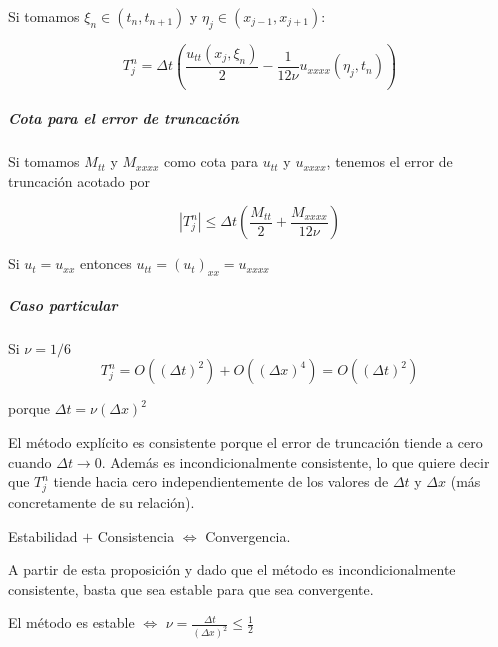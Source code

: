 Si tomamos $\xi_n \in (t_n,t_{n+1})$ y $\eta_j \in (x_{j-1}, x_{j+1}):$

$$T_j^n = \Delta t \left(\frac{u_{tt}(x_j,\xi_n)}{2}- \frac{1}{12\nu} u_{xxxx}(\eta_j,t_n)\right)$$

\subparagraph*{Cota para el error de truncación}

Si tomamos $M_{tt}$ y $M_{xxxx}$ como cota para $u_{tt}$ y $u_{xxxx}$, tenemos el error de truncación acotado por

$$|T_j^n| \le \Delta t \left(\frac{M_{tt}}{2} + \frac{M_{xxxx}}{12{\nu}}\right)$$

Si $u_{t} = u_{xx}$ entonces $u_{tt} = (u_{t})_{xx} = u_{xxxx}$

\subparagraph*{Caso particular}
\mbox{}

Si $\nu = 1/6$
$$T_j^n = O\left((\Delta t)^2\right) + O\left((\Delta x)^4\right) = O\left((\Delta t)^2\right)$$ 

porque 
$\Delta t = \nu (\Delta x )^2$

El método explícito es consistente porque el error de truncación tiende a cero cuando $\Delta t \to 0$.
Además es incondicionalmente consistente, lo que quiere decir que $T_j^n$ tiende hacia cero independientemente de los valores de $\Delta t$ y $\Delta x$ (más concretamente de su relación).

\begin{prop}
	Estabilidad  $+$ Consistencia $\iff$ Convergencia.
\end{prop} 

A partir de esta proposición y dado que el método es incondicionalmente consistente, basta que sea estable para que sea convergente.

\begin{prop}
El método es estable $\iff$ $\nu = \frac{\Delta t}{\left(\Delta x\right)^2} \le \frac{1}{2}$
\end{prop}

